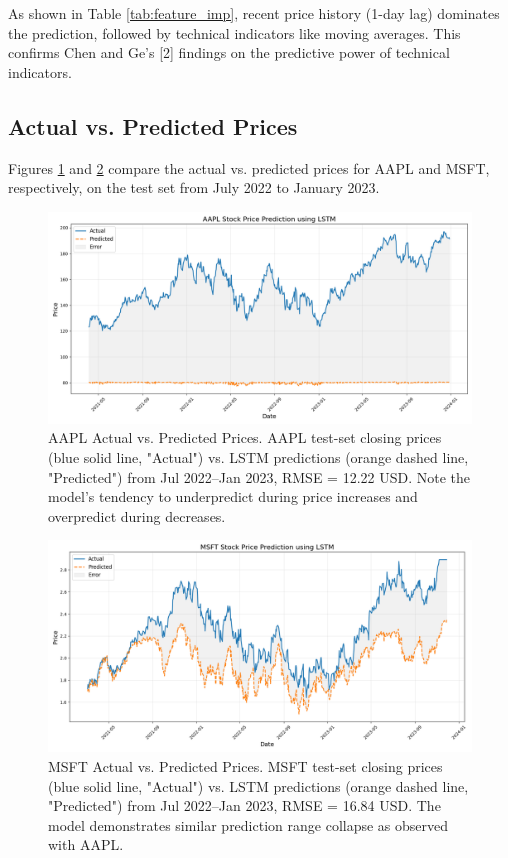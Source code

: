 \documentclass[sigconf]{acmart}
\begin{document}
As shown in Table \ref{tab:feature_imp}, recent price history (1-day lag) dominates the prediction, followed by technical indicators like moving averages. This confirms Chen and Ge's [2] findings on the predictive power of technical indicators.

\subsection{Actual vs. Predicted Prices}

Figures \ref{fig:aapl_pred} and \ref{fig:msft_pred} compare the actual vs. predicted prices for AAPL and MSFT, respectively, on the test set from July 2022 to January 2023.

\begin{figure}[h]
\centering
\includegraphics[width=\linewidth]{AAPL_lstm_predictions_20250429_141539.png}
\caption{AAPL Actual vs. Predicted Prices. AAPL test-set closing prices (blue solid line, "Actual") vs. LSTM predictions (orange dashed line, "Predicted") from Jul 2022–Jan 2023, RMSE = 12.22 USD. Note the model's tendency to underpredict during price increases and overpredict during decreases.}
\label{fig:aapl_pred}
\end{figure}

\begin{figure}[h]
\centering
\includegraphics[width=\linewidth]{MSFT_lstm_predictions_20250429_170820.png}
\caption{MSFT Actual vs. Predicted Prices. MSFT test-set closing prices (blue solid line, "Actual") vs. LSTM predictions (orange dashed line, "Predicted") from Jul 2022–Jan 2023, RMSE = 16.84 USD. The model demonstrates similar prediction range collapse as observed with AAPL.}
\label{fig:msft_pred}
\end{figure}
\end{document}
